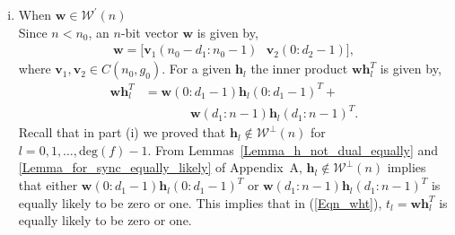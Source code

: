\documentclass[10pt,journal]{IEEEtran}
\def \deg{{\mathrm{deg}}}
\begin{document}
\begin{enumerate}[(i)]
\item When $\mathbf{w} \in \mathcal{W}^{\prime}(n)$\\
Since $n < n_0$, an $n$-bit vector $\mathbf{w}$ is given by, 
% 
\begin{align}
% 
\mathbf{w} = \Big[ \mathbf{v}_{1}(n_0-d_1:n_0-1)  \mbox{~~} \mathbf{v}_{2}(0:d_2-1) \Big],
% 
\end{align}
%
where $\mathbf{v}_1, \mathbf{v}_2 \in C(n_0,g_0)$.
For a given $\mathbf{h}_l$ the inner product $\mathbf{w}\mathbf{h}_l^T$ is given by,
% 
\begin{align}
%  
\mathbf{w} \mathbf{h}_l^T & = \mathbf{w}(0:d_1-1) \mathbf{h}_l(0:d_1-1)^T + \nonumber \\
&\mbox{~~~~~~~~~~~} \mathbf{w}(d_1:n-1) \mathbf{h}_l(d_1:n-1)^T.
\label{Eqn_wht}
% 
\end{align}
% 
Recall that in part (i) we proved that $\mathbf{h}_l \notin \mathcal{W}^{\perp}(n)$ for $l = 0,1,\ldots, \deg(f)-1$.
From Lemmas~\ref{Lemma_h_not_dual_equally} and \ref{Lemma_for_sync_equally_likely} of Appendix~A, $\mathbf{h}_l \notin \mathcal{W}^{\perp}(n)$ implies that 
either $\mathbf{w}(0:d_1-1) \mathbf{h}_l(0:d_1-1)^T$ or $\mathbf{w}(d_1:n-1) \mathbf{h}_l(d_1:n-1)^T$ is equally likely 
to be zero or one.
This implies that in (\ref{Eqn_wht}), $t_l = \mathbf{w} \mathbf{h}_l^T$ is equally likely to be zero or one.

%  
\end{enumerate}
% 
\end{document}
